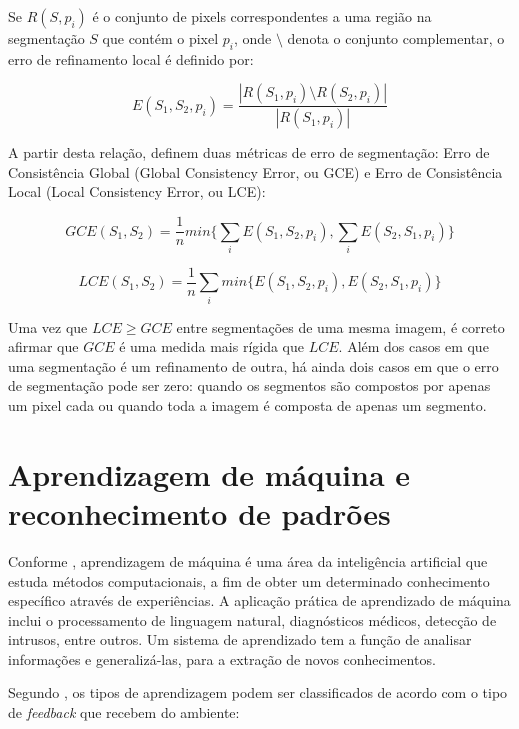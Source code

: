 Se $R(S,p_i)$ é o conjunto de pixels correspondentes a uma região na segmentação $S$ que contém o pixel $p_i$, onde $\setminus$ denota o conjunto complementar, o erro de refinamento local é definido por:

\begin{equation}
	\displaystyle E(S_1,S_2,p_i) = \frac{|R(S_1,p_i) \setminus R(S_2,p_i)|}{|R(S_1,p_i)|}
\end{equation}


A partir desta relação,  definem duas métricas de erro de segmentação: Erro de Consistência Global (Global Consistency Error, ou GCE) e Erro de Consistência Local (Local Consistency Error, ou LCE):

\begin{equation}
	\displaystyle GCE(S_1,S_2) = \frac{1}{n} min \biggl\{ \sum_{i} E(S_1,S_2,p_i), \sum_{i} E(S_2,S_1,p_i) \biggr\}
\end{equation}

\begin{equation}
	\displaystyle LCE(S_1,S_2) = \frac{1}{n} \sum_{i} min \biggl\{ E(S_1,S_2,p_i), E(S_2,S_1,p_i) \biggr\}
\end{equation}

Uma vez que $LCE \geq GCE$ entre segmentações de uma mesma imagem, é correto afirmar que $GCE$ é uma medida mais rígida que $LCE$. Além dos casos em que uma segmentação é um refinamento de outra, há ainda dois casos em que o erro de segmentação pode ser zero: quando os segmentos são compostos por apenas um pixel cada ou quando toda a imagem é composta de apenas um segmento.

\section{Aprendizagem de máquina e reconhecimento de padrões}

Conforme , aprendizagem de máquina é uma área da inteligência artificial que estuda métodos computacionais, a fim de obter um determinado conhecimento específico através de experiências. A aplicação prática de aprendizado de máquina inclui o processamento de linguagem natural, diagnósticos médicos, detecção de intrusos, entre outros. Um sistema de aprendizado tem a função de analisar informações e generalizá-las, para a extração de novos conhecimentos.

Segundo , os tipos de aprendizagem podem ser classificados de acordo com o tipo de \textit{feedback} que recebem do ambiente:


